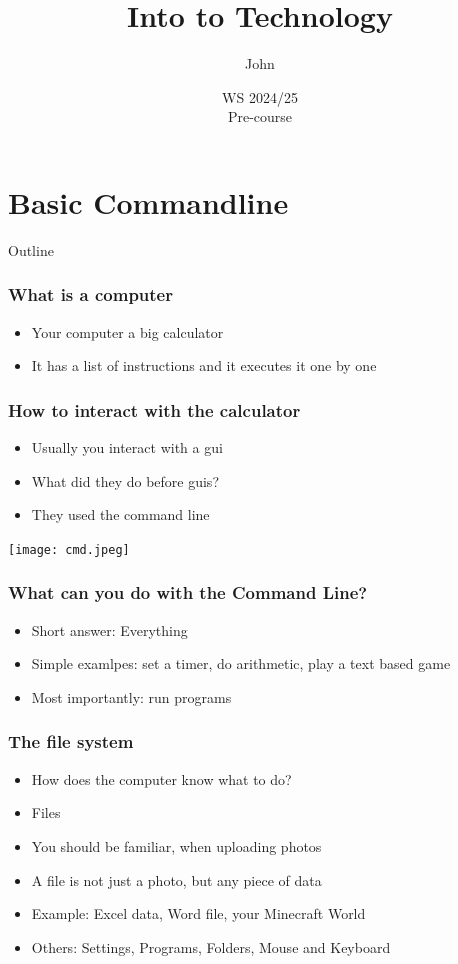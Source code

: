 \documentclass[aspectratio=169,hyperref={unicode}]{beamer}
\title{Into to Technology}
\author{John}
\institute{Fachschaft General \& Computational Linguistics\\ \textbf{University of Tübingen}}
\date{WS 2024/25 \\ Pre-course}
\begin{document}
\begin{frame}
\titlepage
\end{frame}

\section{Basic Commandline}

\begin{frame}{Outline}
\tableofcontents[currentsection]
\end{frame}



\begin{frame}
\frametitle{What is a computer}

\begin{itemize}
\item Your computer a big calculator
        \item It has a list of instructions and it executes it one by one
\end{itemize}
\end{frame}

\begin{frame}
\frametitle{How to interact with the calculator}

\begin{itemize}
\item Usually you interact with a gui
        \item What did they do before guis?
\item They used the command line
\end{itemize}
\texttt{[image: cmd.jpeg]}
\end{frame}
%

\begin{frame}[fragile]
\frametitle{What can you do with the Command Line?}
\begin{itemize}
        \item Short answer: Everything
        \item Simple examlpes: set a timer, do arithmetic, play a text based game
        \item Most importantly: run programs
\end{itemize}
\end{frame}


\begin{frame}[fragile]
\frametitle{The file system}
\begin{itemize}
  \item How does the computer know what to do?
        \item Files
        \item You should be familiar, when uploading photos
        \item A file is not just a photo, but any piece of data
        \item Example: Excel data, Word file, your Minecraft World
        \item Others: Settings, Programs, Folders, Mouse and Keyboard
\end{itemize}
\end{frame}
\end{document}
